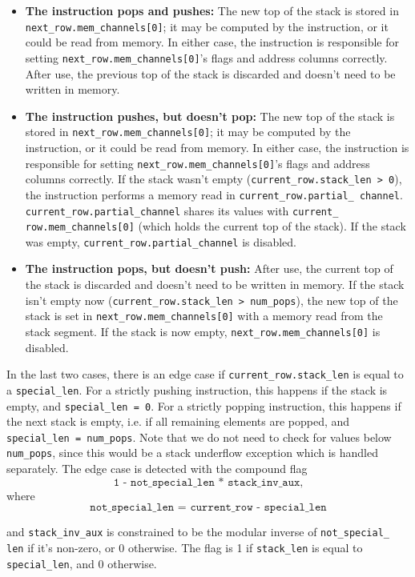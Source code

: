 \begin{itemize}
  \item \textbf{The instruction pops and pushes:} The new top of the stack is stored in \texttt{next\_row.mem\_channels[0]}; it may be computed by the instruction,
or it could be read from memory. In either case, the instruction is responsible for setting \texttt{next\_row.mem\_channels[0]}'s flags and address columns correctly.
After use, the previous top of the stack is discarded and doesn't need to be written in memory.
  \item \textbf{The instruction pushes, but doesn't pop:} The new top of the stack is stored in \texttt{next\_row.mem\_channels[0]}; it may be computed by the instruction,
or it could be read from memory. In either case, the instruction is responsible for setting \texttt{next\_row.mem\_channels[0]}'s flags and address columns correctly.
If the stack wasn't empty (\texttt{current\_row.stack\_len > 0}), the instruction performs a memory read in \texttt{current\_row.partial\_ channel}. \texttt{current\_row.partial\_channel}
shares its values with \texttt{current\_ row.mem\_channels[0]} (which holds the current top of the stack). If the stack was empty, \texttt{current\_row.partial\_channel}
is disabled.
  \item \textbf{The instruction pops, but doesn't push:} After use, the current top of the stack is discarded and doesn't need to be written in memory.
If the stack isn't empty now (\texttt{current\_row.stack\_len > num\_pops}), the new top of the stack is set in \texttt{next\_row.mem\_channels[0]}
with a memory read from the stack segment. If the stack is now empty, \texttt{next\_row.mem\_channels[0]} is disabled.
\end{itemize}

In the last two cases, there is an edge case if \texttt{current\_row.stack\_len} is equal to a \texttt{special\_len}. For a strictly pushing instruction,
this happens if the stack is empty, and \texttt{special\_len = 0}. For a strictly popping instruction, this happens if the next stack is empty, i.e. if
all remaining elements are popped, and \texttt{special\_len = num\_pops}. Note that we do not need to check for values below \texttt{num\_pops}, since this
would be a stack underflow exception which is handled separately.
The edge case is detected with the compound flag
$$\texttt{1 - not\_special\_len * stack\_inv\_aux,}$$
where $$\texttt{not\_special\_len = current\_row - special\_len}$$


and \texttt{stack\_inv\_aux} is constrained to be the modular inverse of \texttt{not\_special\_ len} if it's non-zero, or 0 otherwise. The flag is 1
if \texttt{stack\_len} is equal to \texttt{special\_len}, and 0 otherwise.

